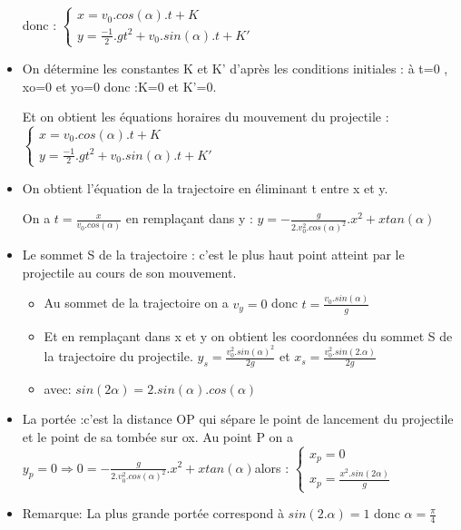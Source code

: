\documentclass[12pt]{article}
\begin{document}
\begin{itemize}
	donc  : $\begin{cases} x = v_0.cos(\alpha).t + K\\y = \frac{-1}{2}.gt^2 + v_0.sin(\alpha).t + K' \end{cases}$ 	

\item On détermine les constantes K et K' d'après les conditions initiales : à t=0 , xo=0 et yo=0 donc :K=0 et K'=0. 
	 
	Et on obtient les équations horaires du mouvement du projectile : $\begin{cases} x = v_0.cos(\alpha).t + K\\y = \frac{-1}{2}.gt^2 + v_0.sin(\alpha).t + K' \end{cases}$


	\item On obtient l'équation de la trajectoire en éliminant t entre x et y.

	On a $t =  \frac{x}{v_0.cos(\alpha)}$ en remplaçant dans y : $y = -\frac{g}{2.v_0^2.cos(\alpha)^2}.x^2 +xtan(\alpha)$

\item Le sommet S de la trajectoire : c'est le plus haut point atteint par le projectile au cours de son mouvement.
	\begin{itemize}
		\item Au sommet de la trajectoire on a $v_y = 0$ donc $t=\frac{v_0.sin(\alpha)}{g}$
		\item Et en remplaçant dans x et y on obtient les coordonnées du sommet S de la trajectoire du projectile. $y_s =\frac{v_0^2.sin(\alpha)^2}{2g}$ et $x_s = \frac{v_0^2.sin(2.\alpha)}{2g}$
		\item avec: $sin(2\alpha) =2.sin(\alpha) . cos(\alpha)$
	\end{itemize}

\item La portée :c'est la distance OP qui sépare le point de lancement du projectile et le point de sa tombée sur ox. Au point P on a $y_p = 0 \Rightarrow 0 = -\frac{g}{2.v_0^2.cos(\alpha)^2}.x^2 +xtan(\alpha)$alors : $\begin{cases} x_p = 0 \\ x_p = \frac{x^2.sin(2\alpha)}{g}\end{cases}$
\item Remarque: La plus grande portée correspond à $sin(2.\alpha) =1$ donc $\alpha = \frac{\pi}{4}$

\end{itemize}
\end{document}
